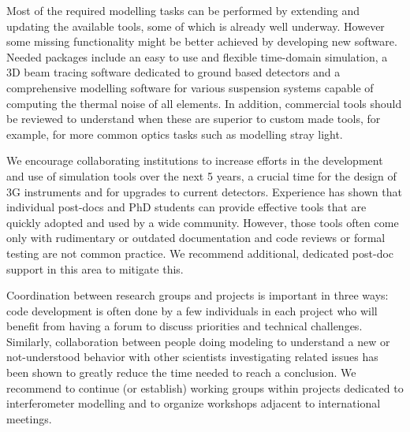 Most of the required modelling tasks can be performed by extending and updating the available tools, some of which is already well underway. However some missing functionality might be better achieved by developing new software. Needed packages include an easy to use and flexible time-domain simulation, a 3D beam tracing software dedicated to ground based detectors and a comprehensive modelling software for various suspension systems capable of computing the thermal noise of all elements. In addition, commercial tools should be reviewed to understand when these are superior to custom made tools, for example, for more common optics tasks such as modelling stray light.

We encourage collaborating institutions to increase efforts in the development and use of simulation tools over the next 5 years, a crucial time for the design of 3G instruments and for upgrades to current detectors.
Experience has shown that individual post-docs and PhD students can provide effective tools that are quickly adopted and used by a wide community. However, those tools often come only with rudimentary or outdated documentation and code reviews or formal testing 
are not common practice. We recommend additional, dedicated post-doc support in this area to mitigate this.

Coordination between research groups and projects is important in three ways:
code development is often done by a few individuals in each project who will benefit from having a forum to discuss priorities and technical challenges. 
Similarly, collaboration between people doing modeling to understand a new or not-understood behavior with other scientists investigating related issues has been shown to greatly reduce the time needed to reach a conclusion. 
We recommend to continue (or establish) working groups within projects dedicated to interferometer modelling and to organize workshops adjacent to international meetings.




